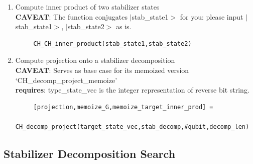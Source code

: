 \documentclass[11pt]{article}
\begin{document}
\begin{enumerate}
\item Compute inner product of two stabilizer states\\
   \textbf{CAVEAT}: The function conjugates $|$stab\_state1$>$ for you: please input $|$stab\_state1$>$, $|$stab\_state2$>$ as is.
  \begin{verbatim}
     CH_CH_inner_product(stab_state1,stab_state2)
  \end{verbatim}    
  
\item Compute projection onto a stabilizer decomposition\\
  \textbf{ CAVEAT}: Serves as base case for its memoized version `CH\_decomp\_project\_memoize'\\
   \textbf{requires}: type\_state\_vec is the integer representation of reverse bit string.\\
  \begin{verbatim}
     [projection,memoize_G,memoize_target_inner_prod] = 
     CH_decomp_project(target_state_vec,stab_decomp,#qubit,decomp_len)
  \end{verbatim}      
  
\end{enumerate}

\subsection{Stabilizer Decomposition Search}
\end{document}
